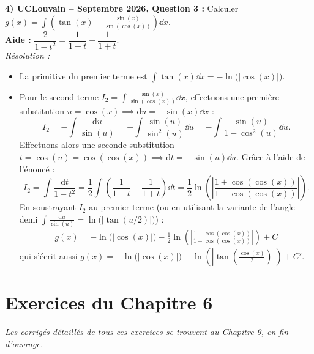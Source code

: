 \begin{exemple}
\medskip
\textbf{4) UCLouvain -- Septembre 2026, Question 3 :} Calculer $g(x) = \displaystyle\int \left(\tan(x) - \frac{\sin(x)}{\sin(\cos(x))}\right)\dd x$.\\
\textbf{Aide :} $\dfrac{2}{1 - t^2} = \dfrac{1}{1 - t} + \dfrac{1}{1 + t}$.\\
\emph{Résolution :}
\begin{itemize}
    \item La primitive du premier terme est $\displaystyle\int \tan(x)\dd x = -\ln\bigl(|\cos(x)|\bigr)$.
    \item Pour le second terme $I_2 = \displaystyle\int \frac{\sin(x)}{\sin(\cos(x))}\dd x$, effectuons une première substitution $\boxed{u = \cos(x)} \implies \mathrm{d}u = -\sin(x)\dd x$ :
    \[
        I_2 = -\int \frac{\mathrm{d}u}{\sin(u)} = -\int \frac{\sin(u)}{\sin^2(u)}\dd u = -\int \frac{\sin(u)}{1 - \cos^2(u)}\dd u.
    \]
    Effectuons alors une seconde substitution $\boxed{t = \cos(u) = \cos(\cos(x))} \implies \mathrm{d}t = -\sin(u)\dd u$. Grâce à l'aide de l'énoncé :
    \[
        I_2 = \int \frac{\mathrm{d}t}{1 - t^2} = \frac{1}{2}\int \left(\frac{1}{1 - t} + \frac{1}{1 + t}\right)\dd t = \frac{1}{2}\ln\left(\left|\frac{1 + \cos(\cos(x))}{1 - \cos(\cos(x))}\right|\right).
    \]
    En soustrayant $I_2$ au premier terme (ou en utilisant la variante de l'angle demi $\int \frac{\mathrm{d}u}{\sin(u)} = \ln\bigl(|\tan(u/2)|\bigr)$) :
    \begin{align*}
        \boxed{g(x) = -\ln\bigl(|\cos(x)|\bigr) - \frac{1}{2}\ln\left(\left|\frac{1 + \cos(\cos(x))}{1 - \cos(\cos(x))}\right|\right) + C}
    \end{align*}
    qui s'écrit aussi $g(x) = -\ln\bigl(|\cos(x)|\bigr) + \ln\left(\left|\tan\left(\frac{\cos(x)}{2}\right)\right|\right) + C'$.
\end{itemize}
\end{exemple}

\section{Exercices du Chapitre 6}

\emph{Les corrigés détaillés de tous ces exercices se trouvent au Chapitre 9, en fin d'ouvrage.}

